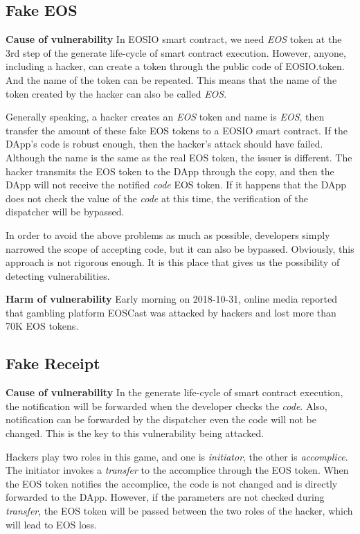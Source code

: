 \documentclass[a4paper, 10pt, conference, twocolumn]{ieeeconf}       %
\begin{document}
\subsection{Fake EOS}\label{3.1}
\textbf{Cause of vulnerability} 
In EOSIO smart contract,
we need \emph{EOS} token at the 3rd step of the generate life-cycle of smart contract execution.
However,
anyone, including a hacker, can create a token through the public code of EOSIO.token.
And the name of the token can be repeated.
This means that the name of the token created by the hacker can also be called \emph{EOS}.

Generally speaking, a hacker creates an \emph{EOS} token and name is \emph{EOS},
then transfer the amount of these fake EOS tokens to a EOSIO smart contract.
If the DApp’s code is robust enough,
then the hacker’s attack should have failed.
Although the name is the same as the real EOS token,
the issuer is different.
The hacker transmits the EOS token to the DApp through the copy, and then the DApp will not receive the notified \emph{code} EOS token.
If it happens that the DApp does not check the value of the \emph{code} at this time,
the verification of the dispatcher will be bypassed.

In order to avoid the above problems as much as possible,
developers simply narrowed the scope of accepting code,
but it can also be bypassed.
Obviously, this approach is not rigorous enough.
It is this place that gives us the possibility of detecting vulnerabilities.

\textbf{Harm of vulnerability}
Early morning on 2018-10-31,
online media reported that gambling platform EOSCast was attacked by hackers and lost more than 70K EOS tokens.\cite{peckshield:2018}

\subsection{Fake Receipt}\label{3.2}
\textbf{Cause of vulnerability} 
In the generate life-cycle of smart contract execution,
the notification will be forwarded when the developer checks the \emph{code}.
Also, notification can be forwarded by the dispatcher even the code will not be changed.
This is the key to this vulnerability being attacked.

Hackers play two roles in this game,
and one is \emph{initiator}, the other is \emph{accomplice}.
The initiator invokes a \emph{transfer} to the accomplice through the EOS token.
When the EOS token notifies the accomplice,
the code is not changed and is directly forwarded to the DApp.
However, if the parameters are not checked during \emph{transfer},
the EOS token will be passed between the two roles of the hacker,
which will lead to EOS loss.
\end{document}
